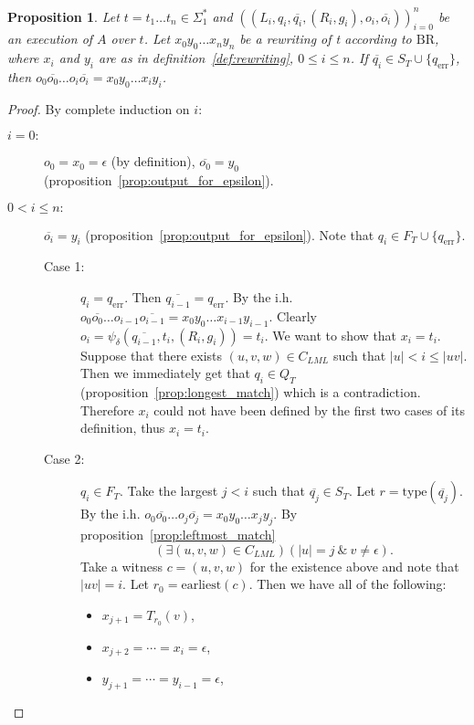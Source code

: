 \documentclass{article}
\newtheorem{proposition}[definition]{Proposition}
\newcommand{\len}[1]{\ensuremath{\left| #1 \right|}}
\begin{document}
	\begin{proposition} \label{prop:execution_output}
		Let $t=t_1\ldots t_n\in \Sigma_1^*$ and $((L_i, q_i, \overline{q_i}, (R_i, g_i), o_i, \overline{o_i}))_{i=0}^n$ be an execution of $A$ over $t$. Let $x_0y_0\ldots x_ny_n$ be a rewriting of t according to $\mathrm{BR}$, where $x_i$ and $y_i$ are as in definition~\ref{def:rewriting}, $0\le i\le n$.
		If $\overline{q_i}\in S_T\cup \{q_\mathrm{err}\}$, then $o_0\overline{o_0}\ldots o_i\overline{o_i} = x_0y_0\ldots x_iy_i$.
	\end{proposition}
	\begin{proof}
		By complete induction on $i$:
		\begin{description}
			\item[$i=0:$]
				\(o_0 = x_0 = \epsilon \) (by definition),
				\( \overline{o_0} = y_0 \) (proposition~\ref{prop:output_for_epsilon}).
			\item[$0<i\le n:$] \( \overline{o_i} = y_i \) (proposition~\ref{prop:output_for_epsilon}). Note that $q_i\in F_T\cup \{q_\mathrm{err}\}$.
				\begin{description}
					\item[Case 1:] $q_i = q_\mathrm{err}$. Then $\overline{q_{i-1}} = q_\mathrm{err}$.
						By the i.h. $o_0\overline{o_0}\ldots o_{i-1}\overline{o_{i-1}} = x_0y_0\ldots x_{i-1}y_{i-1}$. Clearly $o_i = \psi_\delta(\overline{q_{i-1}}, t_i, (R_i, g_i)) = t_i$. We want to show that $x_i = t_i$. Suppose that there exists $(u, v, w)\in C_{LML}$ such that $\len{u} < i\le \len{uv}$. Then we immediately get that $q_i\in Q_T$ (proposition~\ref{prop:longest_match}) which is a contradiction. Therefore $x_i$ could not have been defined by the first two cases of its definition, thus $x_i = t_i$.
					\item[Case 2:] $q_i\in F_T$. Take the largest $j<i$ such that $\overline{q_j}\in S_T$.
						Let $r = \mathrm{type}(\overline{q_j})$.
						By the i.h. $o_0\overline{o_0}\ldots o_j\overline{o_j} = x_0y_0\ldots x_jy_j$. By proposition~\ref{prop:leftmost_match}
						\[ (\exists (u, v, w)\in C_{LML})(\len{u}=j\ \&\ v\ne\epsilon). \]
						Take a witness $c = (u, v, w)$ for the existence above and note that $\len{uv} = i$.
						Let $r_0 = \mathrm{earliest}(c)$. Then we have all of the following:
						\begin{itemize}
							\item \( x_{j+1} = T_{r_0}(v) \),
							\item \( x_{j+2} = \cdots = x_i = \epsilon \),
							\item \( y_{j+1} = \cdots = y_{i-1} = \epsilon \),

\end{itemize}
\end{description}
\end{description}
\end{proof}
\end{document}
